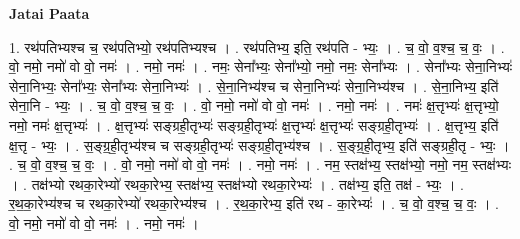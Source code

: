 \documentclass[17pt]{extarticle}
\begin{document}
\textbf{Jatai Paata} \newline

1. रथ॑पतिभ्यश्च च॒ रथ॑पतिभ्यो॒ रथ॑पतिभ्यश्च । . रथ॑पतिभ्य॒ इति॒ रथ॑पति - भ्यः॒ । . च॒ वो॒ व॒श्च॒ च॒ वः॒ । . वो॒ नमो॒ नमो॑ वो वो॒ नमः॑ । . नमो॒ नमः॑ । . नमः॒ सेना᳚भ्यः॒ सेना᳚भ्यो॒ नमो॒ नमः॒ सेना᳚भ्यः । . सेना᳚भ्यः सेना॒निभ्यः॑ सेना॒निभ्यः॒ सेना᳚भ्यः॒ सेना᳚भ्यः सेना॒निभ्यः॑ । . से॒ना॒निभ्य॑श्च च सेना॒निभ्यः॑ सेना॒निभ्य॑श्च । . से॒ना॒निभ्य॒ इति॑ सेना॒नि - भ्यः॒ । . च॒ वो॒ व॒श्च॒ च॒ वः॒ । . वो॒ नमो॒ नमो॑ वो वो॒ नमः॑ । . नमो॒ नमः॑ । . नमः॑ क्ष॒त्तृभ्यः॑ क्ष॒त्तृभ्यो॒ नमो॒ नमः॑ क्ष॒त्तृभ्यः॑ । . क्ष॒त्तृभ्यः॑ सङ्ग्रही॒तृभ्यः॑ सङ्ग्रही॒तृभ्यः॑ क्ष॒त्तृभ्यः॑ क्ष॒त्तृभ्यः॑ सङ्ग्रही॒तृभ्यः॑ । . क्ष॒त्तृभ्य॒ इति॑ क्ष॒त्तृ - भ्यः॒ । . स॒ङ्ग्र॒ही॒तृभ्य॑श्च च सङ्ग्रही॒तृभ्यः॑ सङ्ग्रही॒तृभ्य॑श्च । . स॒ङ्ग्र॒ही॒तृभ्य॒ इति॑ सङ्ग्रही॒तृ - भ्यः॒ । . च॒ वो॒ व॒श्च॒ च॒ वः॒ । . वो॒ नमो॒ नमो॑ वो वो॒ नमः॑ । . नमो॒ नमः॑ । . नम॒ स्तक्ष॑भ्य॒ स्तक्ष॑भ्यो॒ नमो॒ नम॒ स्तक्ष॑भ्यः । . तक्ष॑भ्यो रथका॒रेभ्यो॑ रथका॒रेभ्य॒ स्तक्ष॑भ्य॒ स्तक्ष॑भ्यो रथका॒रेभ्यः॑ । . तक्ष॑भ्य॒ इति॒ तक्ष॑ - भ्यः॒ । . र॒थ॒का॒रेभ्य॑श्च च रथका॒रेभ्यो॑ रथका॒रेभ्य॑श्च । . र॒थ॒का॒रेभ्य॒ इति॑ रथ - का॒रेभ्यः॑ । . च॒ वो॒ व॒श्च॒ च॒ वः॒ । . वो॒ नमो॒ नमो॑ वो वो॒ नमः॑ । . नमो॒ नमः॑ । \newline
\end{document}
